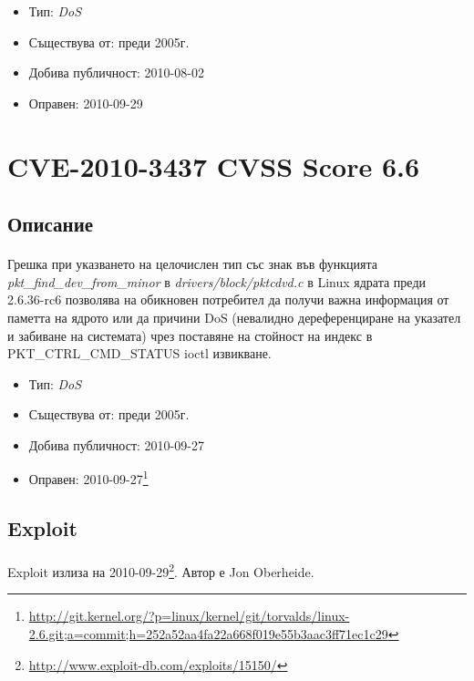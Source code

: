 \documentclass[a4paper,12pt,leqno]{article}
\begin{document}
\begin{itemize}
    \item Тип: \textit{DoS}
    \item Съществува от: преди 2005г.
  	\item Добива публичност: 2010-08-02
    \item Оправен: 2010-09-29
\end{itemize}

\section{CVE-2010-3437 CVSS Score 6.6}
\subsection{Описание}
\paragraph{}
Грешка при указването на целочислен тип със знак във функцията \\ \textit{pkt\_find\_dev\_from\_minor} в \textit{drivers/block/pktcdvd.c} в Linux ядрата преди 2.6.36-rc6 позволява на обикновен потребител да получи важна информация от паметта на ядрото или да причини DoS (невалидно дереференциране на указател и забиване на системата) чрез поставяне на стойност на индекс в \\ PKT\_CTRL\_CMD\_STATUS ioctl извикване.

\begin{itemize}
    \item Тип: \textit{DoS}
    \item Съществува от: преди 2005г.
  	\item Добива публичност: 2010-09-27
    \item Оправен: 2010-09-27\footnote{\url{http://git.kernel.org/?p=linux/kernel/git/torvalds/linux-2.6.git;a=commit;h=252a52aa4fa22a668f019e55b3aac3ff71ec1c29}}
\end{itemize}

\subsection{Exploit}
\paragraph{}
Exploit излиза на 2010-09-29\footnote{\url{http://www.exploit-db.com/exploits/15150/}}. Автор е Jon Oberheide.
\end{document}
